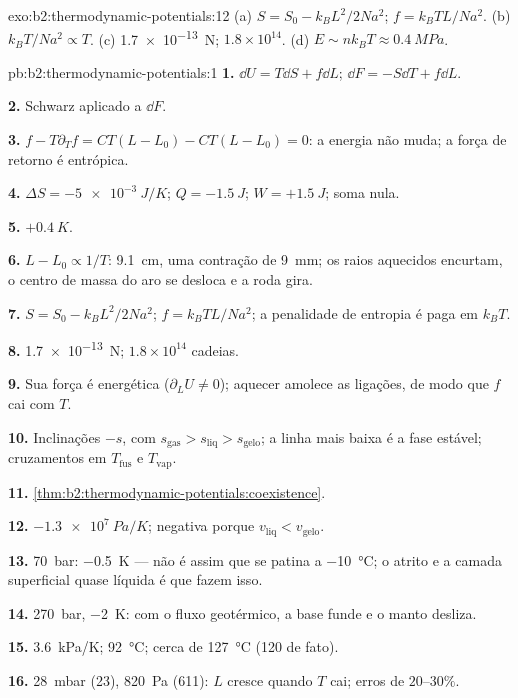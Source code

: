 \begin{solution}{exo:b2:thermodynamic-potentials:12}
(a) $S = S_0 - k_BL^2/2Na^2$; $f = k_BTL/Na^2$. (b) $k_BT/Na^2 \propto T$. (c)
\qty{1.7e-13}{N}; $1.8 \times 10^{14}$. (d) $E \sim nk_BT \approx \qty{0.4}{MPa}$.
\end{solution}

\begin{solution}{pb:b2:thermodynamic-potentials:1}
\textbf{1.} $\dd U = T\dd S + f\dd L$; $\dd F = -S\dd T + f\dd L$.

\textbf{2.} Schwarz aplicado a $\dd F$.

\textbf{3.} $f - T\partial_Tf = CT(L - L_0) - CT(L - L_0) = 0$: a energia
não muda; a força de retorno é entrópica.

\textbf{4.} $\Delta S = \qty{-5e-3}{J/K}$; $Q = \qty{-1.5}{J}$; $W = +\qty{1.5}{J}$; soma
nula.

\textbf{5.} $+\qty{0.4}{K}$.

\textbf{6.} $L - L_0 \propto 1/T$: \qty{9.1}{cm}, uma contração de \qty{9}{mm}; os
raios aquecidos encurtam, o centro de massa do aro se desloca e a roda
gira.

\textbf{7.} $S = S_0 - k_BL^2/2Na^2$; $f = k_BTL/Na^2$; a penalidade de entropia é
paga em $k_BT$.

\textbf{8.} \qty{1.7e-13}{N}; $1.8 \times 10^{14}$ cadeias.

\textbf{9.} Sua força é energética ($\partial_LU \ne 0$); aquecer amolece
as ligações, de modo que $f$ cai com $T$.

\textbf{10.} Inclinações $-s$, com $s_{\text{gas}} > s_{\text{liq}} > s_{\text{gelo}}$; a
linha mais baixa é a fase estável; cruzamentos em $T_{\text{fus}}$ e $T_{\text{vap}}$.

\textbf{11.} \cref{thm:b2:thermodynamic-potentials:coexistence}.

\textbf{12.} $\qty{-1.3e7}{Pa/K}$; negativa porque $v_{\text{liq}} < v_{\text{gelo}}$.

\textbf{13.} \qty{70}{bar}: \qty{-0.5}{K} --- não é assim que se patina a
\qty{-10}{\celsius}; o atrito e a camada superficial quase líquida é que fazem isso.

\textbf{14.} \qty{270}{bar}, \qty{-2}{K}: com o fluxo geotérmico, a
base funde e o manto desliza.

\textbf{15.} \qty{3.6}{kPa/K}; \qty{92}{\celsius}; cerca de \qty{127}{\celsius}
(\qty{120}{} de fato).

\textbf{16.} \qty{28}{mbar} (\qty{23}{}), \qty{820}{Pa} (\qty{611}{}): $L$ cresce quando $T$
cai; erros de $20$--$30\%$.


\end{solution}
